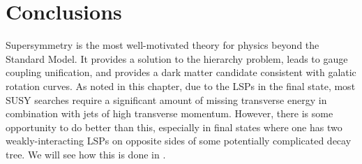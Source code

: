 \section{Conclusions}

Supersymmetry is the most well-motivated theory for physics beyond the Standard Model.
It provides a solution to the hierarchy problem, leads to gauge coupling unification, and provides a dark matter candidate consistent with galatic rotation curves.
As noted in this chapter, due to the LSPs in the final state, most SUSY searches require a significant amount of missing transverse energy in combination with jets of high transverse momentum.
However, there is some opportunity to do better than this, especially in final states where one has two weakly-interacting LSPs on opposite sides of some potentially complicated decay tree.
We will see how this is done in .
